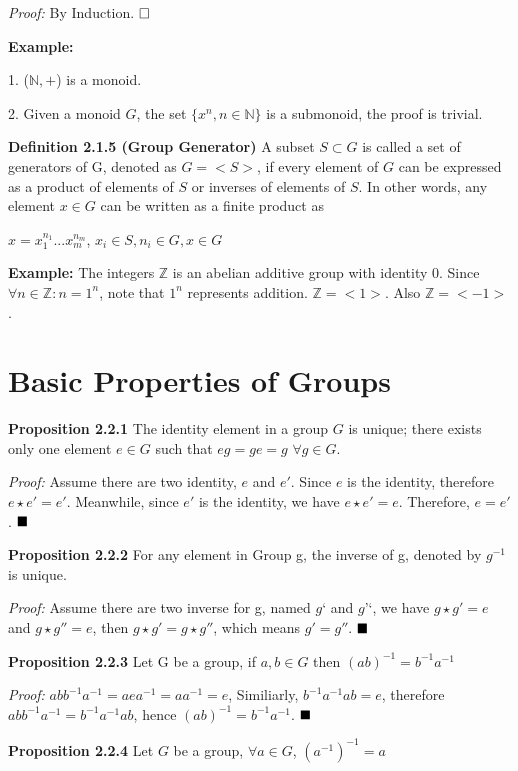 \documentclass[12pt,openany]{book}
\theoremstyle{definition}
\theoremstyle{definition}
\begin{document}
\textit{Proof:} By Induction. $\hfill \square$

\noindent\textbf{Example:}

1. ($\mathbb{N},+$) is a monoid.

2. Given a monoid $G$, the set ${\{x^{n}, n \in \mathbb{N} \}}$ is a submonoid, the proof is trivial.

\noindent\textbf{Definition 2.1.5 (Group Generator)} A subset $S \subset G$ is called a set of generators of G, denoted as $G=<S>$, if every element of $G$ can be expressed as a product of elements of $S$ or inverses of elements of $S$. In other words, any element $x \in G$ can be written as a finite product as 

$x = x_{1}^{n_{1}}...x_{m}^{n_{m}}$, $x_{i} \in S, n_{i} \in G, x \in G$

\noindent\textbf{Example:} The integers $\mathbb{Z}$ is an abelian additive group with identity 0. Since $\forall n \in \mathbb{Z}: n=1^{n}$, note that $1^{n}$ represents addition. $\mathbb{Z}=<1>$. Also $\mathbb{Z}=<-1>$.

\section{Basic Properties of Groups}

\textbf{Proposition 2.2.1} The identity element in a group $G$ is unique; there exists only one element $e \in G$ such that $eg = ge = g $ $\forall g \in G$.

\textit{Proof:} Assume there are two identity, $e $ and $ e'$. Since $e$ is the identity, therefore $e\star e' = e'$. Meanwhile, since $e'$ is the identity, we have $e \star e' = e$. Therefore, $e = e'$. $\hfill\blacksquare$

\noindent \textbf{Proposition 2.2.2} For any element in Group g, the inverse of g, denoted by $g^{-1}$ is unique.

\textit{Proof:} Assume there are two inverse for g, named $g‘$ and $g’‘$, we have $g \star g' = e$ and $g \star g'' = e$, then $g \star g' = g \star g''$, which means $g' = g''$. $\hfill\blacksquare$

\noindent \textbf{Proposition 2.2.3} Let G be a group, if $a, b \in G$ then $(ab)^{-1} = b^{-1}a^{-1}$

\textit{Proof:} $abb^{-1}a^{-1} = aea^{-1} = aa^{-1} = e $, Similiarly, $b^{-1}a^{-1}ab = e$, therefore $abb^{-1}a^{-1} = b^{-1}a^{-1}ab $, hence $(ab)^{-1} = b^{-1}a^{-1}$. $\hfill\blacksquare$

\noindent \textbf{Proposition 2.2.4} Let $G$ be a group, $\forall a \in G$, $(a^{-1})^{-1}=a$
\end{document}
